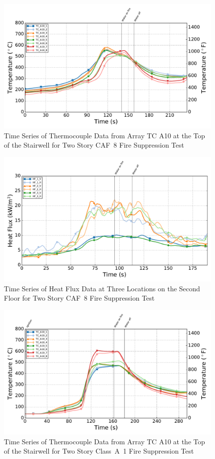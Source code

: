 \documentclass[12pt,oneside]{book}
\begin{document}
\begin{figure}[!ht]
	\includegraphics[width=.85\columnwidth]{../Figures/Script_Figures/Test_40c_West_061415_TC_A10}
	\caption{Time Series of Thermocouple Data from Array TC A10 at the Top of the Stairwell for Two Story CAF~8 Fire Suppression Test}
	\label{fig:app_caf8_tca10}
\end{figure}

\begin{figure}[!ht]
	\includegraphics[width=.85\columnwidth]{../Figures/Script_Figures/Test_40c_West_061415_Heat_Flux}
	\caption{Time Series of Heat Flux Data at Three Locations on the Second Floor for Two Story CAF~8 Fire Suppression Test}
	\label{fig:app_caf8_hf}
\end{figure}

\begin{figure}[!ht]
	\includegraphics[width=.85\columnwidth]{../Figures/Script_Figures/Test_41a_West_061415_TC_A10}
	\caption{Time Series of Thermocouple Data from Array TC A10 at the Top of the Stairwell for Two Story Class~A~1 Fire Suppression Test}
	\label{fig:app_classa1_tca10}
\end{figure}
\end{document}
